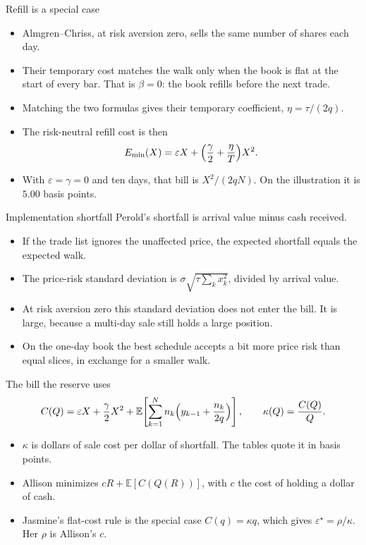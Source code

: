 \documentclass[aspectratio=169,10pt]{beamer}
\newcommand{\currentsource}{}
\newcommand{\framesource}[1]{\gdef\currentsource{#1}}
\begin{document}
\begin{frame}{Refill is a special case}
\framesource{Almgren and Chriss, 2001, eqs.~(9)--(10)}
\begin{itemize}
\item Almgren--Chriss, at risk aversion zero, sells the same number of shares each day.
\item Their temporary cost matches the walk only when the book is flat at the start of every bar. That is \(\beta=0\): the book refills before the next trade.
\item Matching the two formulas gives their temporary coefficient, \(\eta=\tau/(2q)\).
\item The risk-neutral refill cost is then
\[
E_{\min}(X)=\varepsilon X+\Bigl(\frac{\gamma}{2}+\frac{\eta}{T}\Bigr)X^{2}.
\]
\item With \(\varepsilon=\gamma=0\) and ten days, that bill is \(X^{2}/(2qN)\). On the illustration it is \(5.00\) basis points.
\end{itemize}
\end{frame}

\begin{frame}{Implementation shortfall}
\framesource{Perold, 1988; Almgren and Chriss, 2001}
Perold's shortfall is arrival value minus cash received.
\begin{itemize}
\item If the trade list ignores the unaffected price, the expected shortfall equals the expected walk.
\item The price-risk standard deviation is \(\sigma\sqrt{\tau\sum_k x_k^{2}}\), divided by arrival value.
\item At risk aversion zero this standard deviation does not enter the bill. It is large, because a multi-day sale still holds a large position.
\item On the one-day book the best schedule accepts a bit more price risk than equal slices, in exchange for a smaller walk.
\end{itemize}
\end{frame}

\begin{frame}{The bill the reserve uses}
\framesource{Almgren and Chriss, 2001; Allison Duffy and Jasmine Li}
\[
C(Q)
=\varepsilon X+\frac{\gamma}{2}X^{2}
+\mathbb{E}\!\left[\sum_{k=1}^{N}n_k\Bigl(y_{k-1}+\frac{n_k}{2q}\Bigr)\right],
\qquad
\kappa(Q)=\frac{C(Q)}{Q}.
\]
\begin{itemize}
\item \(\kappa\) is dollars of sale cost per dollar of shortfall. The tables quote it in basis points.
\item Allison minimizes \(cR+\mathbb{E}[C(Q(R))]\), with \(c\) the cost of holding a dollar of cash.
\item Jasmine's flat-cost rule is the special case \(C(q)=\kappa q\), which gives \(\varepsilon^{\star}=\rho/\kappa\). Her \(\rho\) is Allison's \(c\).
\end{itemize}
\end{frame}
\end{document}
